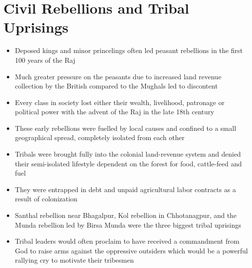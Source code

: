 \section{Civil Rebellions and Tribal Uprisings}
\begin{itemize}
    \item Deposed kings and minor princelings often led peasant rebellions in the first 100 years of the Raj
    \item Much greater pressure on the peasants due to increased land revenue collection by the British compared to the Mughals led to discontent
    \item Every class in society lost either their wealth, livelihood, patronage or political power with the advent of the Raj in the late 18th century
    \item These early rebellions were fuelled by local causes and confined to a small geographical spread, completely isolated from each other
    \item Tribals were brought fully into the colonial land-revenue system and denied their semi-isolated lifestyle dependent on the forest for food, cattle-feed and fuel
    \item They were entrapped in debt and unpaid agricultural labor contracts as a result of colonization
    \item Santhal rebellion near Bhagalpur, Kol rebellion in Chhotanagpur, and the Munda rebellion led by Birsa Munda were the three biggest tribal uprisings
    \item Tribal leaders would often proclaim to have received a commandment from God to raise arms against the oppressive outsiders which would be a powerful rallying cry to motivate their tribesmen
\end{itemize}


